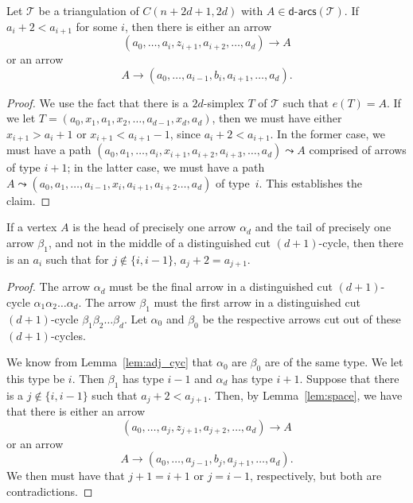 \documentclass[ALCO,Unicode,published]{cedram}
\newcommand{\darcs}[1]{\mathsf{d}\text{-}\mathsf{arcs}(#1)} %
\begin{document}
\begin{lemma}\label{lem:space}
Let $\mathcal{T}$ be a triangulation of $C(n + 2d + 1, 2d)$ with $A \in \darcs{\mathcal{T}}$. If $a_{i} + 2 < a_{i + 1}$ for some $i$, then there is either an arrow \[(a_{0}, \dots, a_{i}, z_{i + 1}, a_{i + 2}, \dots, a_{d}) \to A\] or an arrow \[A \to (a_{0}, \dots, a_{i - 1}, b_{i}, a_{i + 1}, \dots, a_{d}).\]
\end{lemma}
\begin{proof}
We use the fact that there is a $2d$-simplex $T$ of $\mathcal{T}$ such that $e(T) = A$. If we let $T = (a_{0}, x_{1}, a_{1}, x_{2}, \dots, a_{d - 1}, x_{d}, a_{d})$, then we must have either $x_{i + 1} > a_{i} + 1$ or $x_{i + 1} < a_{i + 1} - 1$, since $a_{i} + 2 < a_{i + 1}$. In the former case, we must have a path $(a_{0}, a_{1}, \dots, a_{i}, x_{i + 1}, a_{i + 2}, a_{i + 3}, \dots, a_{d}) \leadsto A$ comprised of arrows of type $i + 1$; in the latter case, we must have a path $A \leadsto (a_{0}, a_{1}, \dots, a_{i - 1}, x_{i}, a_{i + 1}, a_{i + 2} \dots, a_{d})$ of type~$i$. This establishes the claim.
\end{proof}

\begin{lemma}\label{lem:vert_form}
If a vertex $A$ is the head of precisely one arrow $\alpha_{d}$ and the tail of precisely one arrow $\beta_{1}$, and not in the middle of a distinguished cut $(d + 1)$-cycle, then there is an $a_{i}$ such that for $j \notin \{i, i - 1\}$, $a_{j} + 2 = a_{j + 1}$.
\end{lemma}
\begin{proof}
The arrow $\alpha_{d}$ must be the final arrow in a distinguished cut $(d + 1)$-cycle $\alpha_{1}\alpha_{2}\dots \alpha_{d}$. The arrow $\beta_{1}$ must the first arrow in a distinguished cut $(d + 1)$-cycle $\beta_{1}\beta_{2}\dots \beta_{d}$. Let $\alpha_{0}$ and $\beta_{0}$ be the respective arrows cut out of these $(d + 1)$-cycles.

We know from Lemma~\ref{lem:adj_cyc} that $\alpha_{0}$ are $\beta_{0}$ are of the same type. We let this type be $i$. Then $\beta_{1}$ has type $i - 1$ and $\alpha_{d}$ has type $i + 1$. Suppose that there is a $j \notin \{i, i - 1\}$ such that $a_{j} + 2 < a_{j + 1}$. Then, by Lemma~\ref{lem:space}, we have that there is either an arrow \[(a_{0}, \dots, a_{j}, z_{j + 1}, a_{j + 2}, \dots, a_{d}) \to A\] or an arrow \[A \to (a_{0}, \dots, a_{j - 1}, b_{j}, a_{j + 1}, \dots, a_{d}).\] We then must have that $j + 1 = i + 1$ or $j = i - 1$, respectively, but both are contradictions.
\end{proof}
\end{document}
